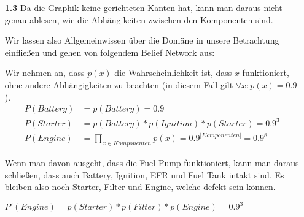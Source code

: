 \documentclass[a4paper,11pt]{article}
\author{\authorinfo}
\title{\titleinfo}
\date{\today}
\begin{document}
\maketitle
\begin{enumerate}
\item[\textbf{1.3}]
    Da die Graphik keine gerichteten Kanten hat, kann man daraus nicht genau ablesen, wie die Abhängikeiten zwischen den Komponenten sind.
   
    Wir lassen also Allgemeinwissen über die Domäne in unsere Betrachtung einfließen und gehen von folgendem Belief Network aus:




    Wir nehmen an, dass $p(x)$ die Wahrscheinlichkeit ist, dass $x$ funktioniert, ohne andere Abhängigkeiten zu beachten (in diesem Fall gilt $\forall x: p(x) = 0.9$).
    \begin{align*}
    P(Battery) &= p(Battery) = 0.9 \\
    P(Starter) &= p(Battery) * p(Ignition) * p(Starter) = 0.9^3 \\
    P(Engine)  &= \prod_{x \in Komponenten} p(x) = 0.9^{|Komponenten|} = 0.9^8
    \end{align*}

    Wenn man davon ausgeht, dass die Fuel Pump funktioniert, kann man daraus schließen, dass auch Battery, Ignition, EFR und Fuel Tank intakt sind. Es bleiben also noch Starter, Filter und Engine, welche defekt sein können.

    $P'(Engine) = p(Starter) * p(Filter) * p(Engine) = 0.9^3 $
\end{enumerate}
\end{document}
